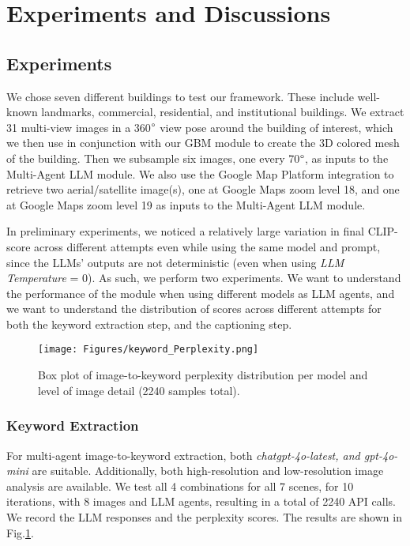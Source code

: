\section{Experiments and Discussions}
\subsection{Experiments}
We chose seven different buildings to test our framework. These include well-known landmarks, commercial, residential, and institutional buildings. We extract 31 multi-view images in a 360$\degree$ view pose around the building of interest, which we then use in conjunction with our GBM module to create the 3D colored mesh of the building. Then we subsample six images, one every 70$\degree$, as inputs to the Multi-Agent LLM module. We also use the Google Map Platform integration to retrieve two aerial/satellite image(s), one at Google Maps zoom level 18, and one at Google Maps zoom level 19 as inputs to the Multi-Agent LLM module.

In preliminary experiments, we noticed a relatively large variation in final CLIP-score across different attempts even while using the same model and prompt, since the LLMs' outputs are not deterministic (even when using \textit{LLM Temperature} = 0). As such, we perform two experiments. We want to understand the performance of the module when using different models as LLM agents, and we want to understand the distribution of scores across different attempts for both the keyword extraction step, and the captioning step. 

\begin{figure}[htpb]
\centering
\texttt{[image: Figures/keyword\_Perplexity.png]}
\caption{Box plot of image-to-keyword perplexity distribution per model and level of image detail (2240 samples total).}\label{fig:perplexity}
\end{figure}
\subsubsection{Keyword Extraction}
For multi-agent image-to-keyword extraction, both \textit{chatgpt-4o-latest, and gpt-4o-mini} are suitable. Additionally, both high-resolution and low-resolution image analysis are available. We test all 4 combinations for all 7 scenes, for 10 iterations, with 8 images and LLM agents, resulting in a total of 2240 API calls. We record the LLM responses and the perplexity scores. The results are shown in Fig.\ref{fig:perplexity}.

